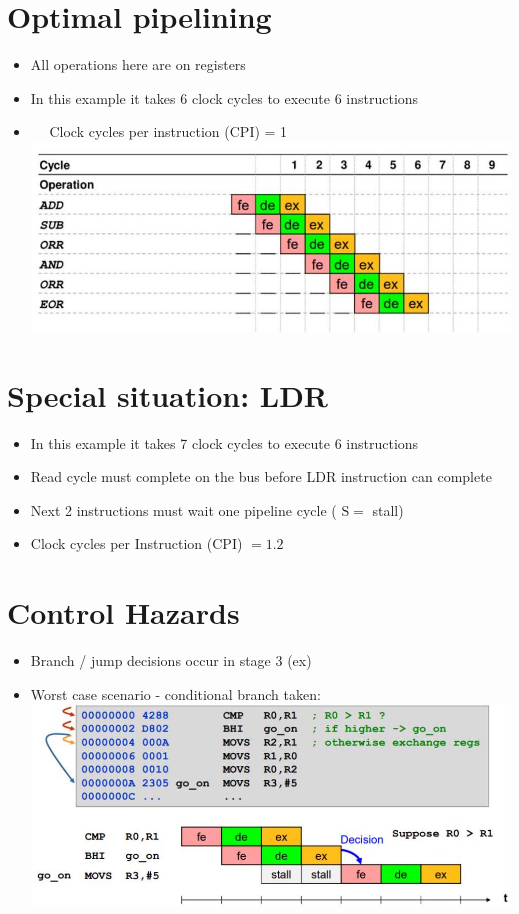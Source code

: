     \section*{Optimal pipelining}
    \begin{itemize}
      \item All operations here are on registers
      \item In this example it takes 6 clock cycles to execute 6 instructions
      \item $\quad$ Clock cycles per instruction (CPI) = 1\\
    \includegraphics[width=\linewidth]{images/2024_12_29_79e6b22f503fb7b4f718g-14}
    \end{itemize}
    
    \section*{Special situation: LDR}
    \begin{itemize}
      \item In this example it takes 7 clock cycles to execute 6 instructions
      \item Read cycle must complete on the bus before LDR instruction can complete
      \item Next 2 instructions must wait one pipeline cycle ( $\mathrm{S}=$ stall)
      \item Clock cycles per Instruction (CPI) $=1.2$
    \end{itemize}
    
    \section*{Control Hazards}
    \begin{itemize}
      \item Branch / jump decisions occur in stage 3 (ex)
      \item Worst case scenario - conditional branch taken:\\
    \includegraphics[width=\linewidth]{images/2024_12_29_79e6b22f503fb7b4f718g-15}
    \end{itemize}
    
